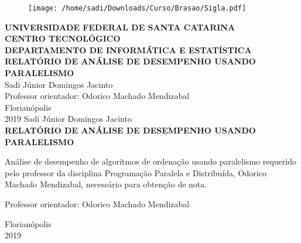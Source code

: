 \documentclass[12pt,a4paper,brazil,abntex2]{article}
\begin{document}
\singlespacing
\begin{titlepage}
\begin{center}
\begin{figure}[!htb]
\center

\texttt{[image: /home/sadi/Downloads/Curso/Brasao/Sigla.pdf]} 

\end{figure}
{\bf  UNIVERSIDADE FEDERAL DE SANTA CATARINA}\\[0.2cm]
{\bf CENTRO TECNOLÓGICO}\\[0.2cm]
{\bf  DEPARTAMENTO DE INFORMÁTICA E ESTATÍSTICA}\\[5.5cm]
{\bf \large RELATÓRIO DE ANÁLISE DE DESEMPENHO USANDO PARALELISMO}\\[3.6 cm]
{Sadi Júnior Domingos Jacinto}\\[1cm]
{Professor orientador: Odorico Machado Mendizabal}\\[4.1 cm]
{Florianópolis}\\[0.2cm]
{2019}
\newpage
\thispagestyle{empty}
{Sadi Júnior Domingos Jacinto}\\[9cm]
{\bf \large RELATÓRIO DE ANÁLISE DE DESEMPENHO USANDO PARALELISMO}\\[0.5cm]
    \begin{flushright}
    \begin{list}{}{
      \setlength{\leftmargin}{7.2cm}
      \setlength{\rightmargin}{0cm}
      \setlength{\labelwidth}{0pt}
      \setlength{\labelsep}{\leftmargin}}
      \item Análise de desempenho de algoritmos de ordenação usando paralelismo requerido pelo professor da disciplina Programação Paralela e Distribuída, Odorico Machado Mendizabal, necessário para obtenção de nota.\\[0.2 cm] 
      \setlength{\labelsep}{\leftmargin}
      \item Professor orientador: Odorico Machado Mendizabal\
      \\[8.2cm]
     \end{list}
	 \end{flushright}
{Florianópolis}\\[0.2cm]
{2019}
\end{center}
\end{titlepage} %

\newpage
\thispagestyle{empty}
\begin{center}
\tableofcontents
\end{center}


	





\end{document}

